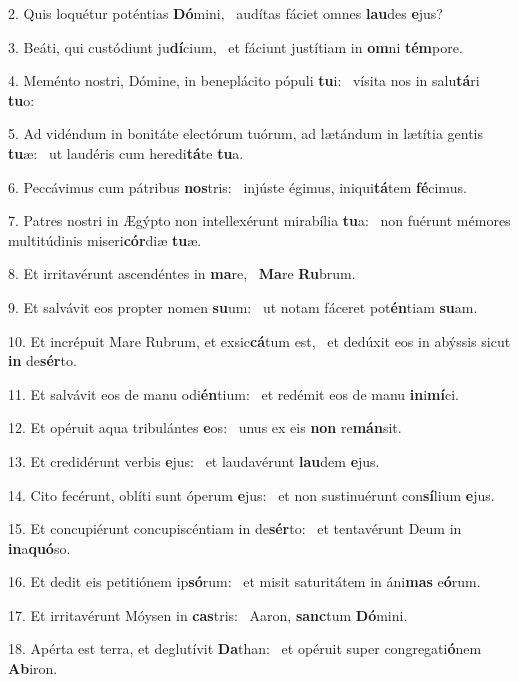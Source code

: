 2. Quis loquétur poténtias \textbf{Dó}mini, \ast\  audítas fáciet omnes \textbf{lau}des \textbf{e}jus?\

3. Beáti, qui custódiunt ju\textbf{dí}cium, \ast\  et fáciunt justítiam in \textbf{om}ni \textbf{tém}pore.\

4. Meménto nostri, Dómine, in beneplácito pópuli \textbf{tu}i: \ast\  vísita nos in salu\textbf{tá}ri \textbf{tu}o:\

5. Ad vidéndum in bonitáte electórum tuórum, ad lætándum in lætítia gentis \textbf{tu}æ: \ast\  ut laudéris cum heredi\textbf{tá}te \textbf{tu}a.\

6. Peccávimus cum pátribus \textbf{nos}tris: \ast\  injúste égimus, iniqui\textbf{tá}tem \textbf{fé}cimus.\

7. Patres nostri in Ægýpto non intellexérunt mirabília \textbf{tu}a: \ast\  non fuérunt mémores multitúdinis miseri\textbf{cór}diæ \textbf{tu}æ.\

8. Et irritavérunt ascendéntes in \textbf{ma}re, \ast\  \textbf{Ma}re \textbf{Ru}brum.\

9. Et salvávit eos propter nomen \textbf{su}um: \ast\  ut notam fáceret pot\textbf{én}tiam \textbf{su}am.\

10. Et incrépuit Mare Rubrum, et exsic\textbf{cá}tum est, \ast\  et dedúxit eos in abýssis sicut \textbf{in} de\textbf{sér}to.\

11. Et salvávit eos de manu odi\textbf{én}tium: \ast\  et redémit eos de manu \textbf{in}i\textbf{mí}ci.\

12. Et opéruit aqua tribulántes \textbf{e}os: \ast\  unus ex eis \textbf{non} re\textbf{mán}sit.\

13. Et credidérunt verbis \textbf{e}jus: \ast\  et laudavérunt \textbf{lau}dem \textbf{e}jus.\

14. Cito fecérunt, oblíti sunt óperum \textbf{e}jus: \ast\  et non sustinuérunt con\textbf{sí}lium \textbf{e}jus.\

15. Et concupiérunt concupiscéntiam in de\textbf{sér}to: \ast\  et tentavérunt Deum in \textbf{in}a\textbf{quó}so.\

16. Et dedit eis petitiónem ip\textbf{só}rum: \ast\  et misit saturitátem in áni\textbf{mas} e\textbf{ó}rum.\

17. Et irritavérunt Móysen in \textbf{cas}tris: \ast\  Aaron, \textbf{sanc}tum \textbf{Dó}mini.\

18. Apérta est terra, et deglutívit \textbf{Da}than: \ast\  et opéruit super congregati\textbf{ó}nem \textbf{Ab}iron.\

